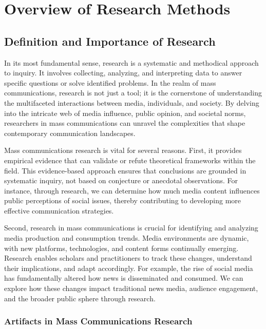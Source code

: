 \documentclass[
]{book}
\begin{document}
\chapter{Overview of Research Methods}\label{overview-of-research-methods}

\section{Definition and Importance of Research}\label{definition-and-importance-of-research}

In its most fundamental sense, research is a systematic and methodical approach to inquiry. It involves collecting, analyzing, and interpreting data to answer specific questions or solve identified problems. In the realm of mass communications, research is not just a tool; it is the cornerstone of understanding the multifaceted interactions between media, individuals, and society. By delving into the intricate web of media influence, public opinion, and societal norms, researchers in mass communications can unravel the complexities that shape contemporary communication landscapes.

Mass communications research is vital for several reasons. First, it provides empirical evidence that can validate or refute theoretical frameworks within the field. This evidence-based approach ensures that conclusions are grounded in systematic inquiry, not based on conjecture or anecdotal observations. For instance, through research, we can determine how much media content influences public perceptions of social issues, thereby contributing to developing more effective communication strategies.

Second, research in mass communications is crucial for identifying and analyzing media production and consumption trends. Media environments are dynamic, with new platforms, technologies, and content forms continually emerging. Research enables scholars and practitioners to track these changes, understand their implications, and adapt accordingly. For example, the rise of social media has fundamentally altered how news is disseminated and consumed. We can explore how these changes impact traditional news media, audience engagement, and the broader public sphere through research.

\subsection*{Artifacts in Mass Communications Research}\label{artifacts-in-mass-communications-research}
\end{document}
